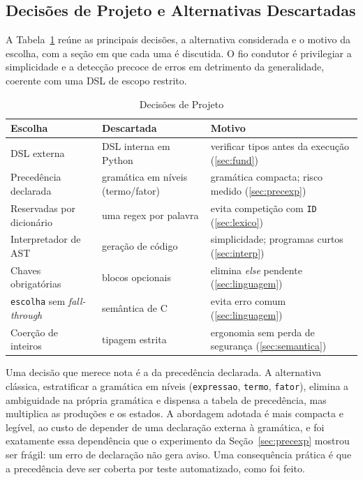 \documentclass[conference]{IEEEtran}
\begin{document}
\subsection{Decisões de Projeto e Alternativas Descartadas}

A Tabela~\ref{tab:decisoes} reúne as principais decisões, a alternativa considerada e o motivo da escolha, com a seção em que cada uma é discutida. O fio condutor é privilegiar a simplicidade e a detecção precoce de erros em detrimento da generalidade, coerente com uma DSL de escopo restrito.

\begin{table}[!htbp]
\caption{Decisões de Projeto}
\label{tab:decisoes}
\centering
\footnotesize
\setlength{\tabcolsep}{3pt}\begin{tabular}{@{}p{}p{}p{}@{}}
\toprule
\textbf{Escolha} & \textbf{Descartada} & \textbf{Motivo} \\
\midrule
DSL externa & DSL interna em Python & verificar tipos antes da execução (\ref{sec:fund}) \\
Precedência declarada & gramática em níveis (termo/fator) & gramática compacta; risco medido (\ref{sec:precexp}) \\
Reservadas por dicionário & uma regex por palavra & evita competição com \texttt{ID} (\ref{sec:lexico}) \\
Interpretador de AST & geração de código & simplicidade; programas curtos (\ref{sec:interp}) \\
Chaves obrigatórias & blocos opcionais & elimina \textit{else} pendente (\ref{sec:linguagem}) \\
\texttt{escolha} sem \textit{fall-through} & semântica de C & evita erro comum (\ref{sec:linguagem}) \\
Coerção de inteiros & tipagem estrita & ergonomia sem perda de segurança (\ref{sec:semantica}) \\
\bottomrule
\end{tabular}
\end{table}

Uma decisão que merece nota é a da precedência declarada. A alternativa clássica, estratificar a gramática em níveis (\texttt{expressao}, \texttt{termo}, \texttt{fator}), elimina a ambiguidade na própria gramática e dispensa a tabela de precedência, mas multiplica as produções e os estados. A abordagem adotada é mais compacta e legível, ao custo de depender de uma declaração externa à gramática, e foi exatamente essa dependência que o experimento da Seção~\ref{sec:precexp} mostrou ser frágil: um erro de declaração não gera aviso. Uma consequência prática é que a precedência deve ser coberta por teste automatizado, como foi feito.
\end{document}
